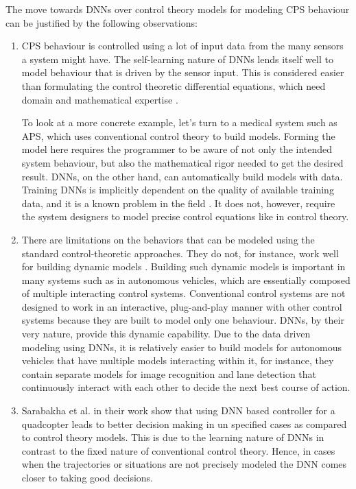 The move towards DNNs over control theory models for modeling \ac{CPS} behaviour can be justified by the following observations:
\begin{enumerate}
	\item CPS behaviour is controlled using a lot of input data from the many sensors a system might have. The self-learning nature of DNNs lends itself well to model behaviour that is driven by the sensor input. This is considered easier than formulating the control theoretic differential equations, which need domain and mathematical expertise \cite{Aamir_2013}.
	
	
	To look at a more concrete example, let's turn to a medical system such as \ac{APS}, which uses conventional control theory to build models. Forming the model here requires the programmer to be aware of not only the intended system behaviour, but also the mathematical rigor needed to get the desired result. DNNs, on the other hand, can automatically build models with data.
	Training DNNs is implicitly dependent on the quality of available training data, and it is a known problem in the field \cite{jabbar2015methods}. It does not, however, require the system designers to model precise control equations like in control theory.
	\item  There are limitations on the behaviors that can be modeled using the standard control-theoretic approaches. They do not, for instance, work well for building dynamic models \cite{article23}. Building such dynamic models is important in many systems such as in autonomous vehicles, which are essentially composed of multiple interacting control systems. Conventional control systems are not designed to work in an interactive, plug-and-play manner with other control systems because they are built to model only one behaviour. DNNs, by their very nature,  provide this dynamic capability. 
	Due to the data driven modeling using DNNs, it is relatively easier to build models for autonomous vehicles that have multiple models interacting within it, for instance, they contain separate models for image recognition and lane detection that continuously interact with each other to decide the next best course of action.
	
	\item Sarabakha et al. \cite{sarabakha2019online} in their work show that using \ac{DNN} based controller for a quadcopter leads to better decision making in un specified cases as compared to control theory models.
	This is due to the learning nature of \ac{DNN}s in contrast to the fixed nature of conventional control theory. 
	Hence, in cases when the trajectories or situations are not precisely modeled the \ac{DNN} comes closer to taking good decisions.
\end{enumerate}




